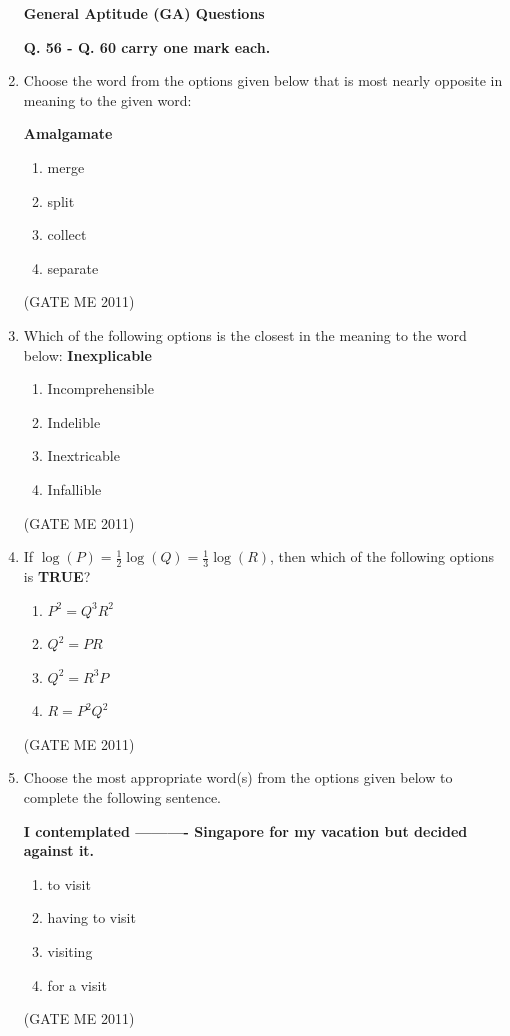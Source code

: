 \documentclass[journal]{IEEEtran}
\begin{document}
\begin{enumerate}
\textbf{General Aptitude (GA) Questions}

\textbf{Q. 56 - Q. 60 carry one mark each.}

  \item Choose the word from the options given below that is most nearly opposite in meaning to the given word:
  
\textbf{Amalgamate}
    \begin{enumerate}
      \item merge
      \item split
      \item collect
      \item separate
    \end{enumerate}
    \hfill (GATE ME 2011)

  \item Which of the following options is the closest in the meaning to the word below: 
\textbf{Inexplicable}
    \begin{enumerate}
      \item Incomprehensible
      \item Indelible
      \item Inextricable
      \item Infallible
    \end{enumerate}
    \hfill (GATE ME 2011)

  \item If $\log(P) = \frac{1}{2} \log(Q) = \frac{1}{3} \log(R)$, then which of the following options is \textbf{TRUE}?
  \begin{multicols}{4}
    \begin{enumerate}
      \item $P^2 = Q^3 R^2$
      \item $Q^2 = PR$
      \item $Q^2 = R^3 P$
      \item $R = P^2 Q^2$
    \end{enumerate}
  \end{multicols}   
  \hfill (GATE ME 2011)

  \item Choose the most appropriate word(s) from the options given below to complete the following sentence.
  
 \textbf{I contemplated ---------- Singapore for my vacation but decided against it.}
 
    \begin{enumerate}
      \item to visit
      \item having to visit
      \item visiting
      \item for a visit
    \end{enumerate}
    \hfill (GATE ME 2011)
    

\end{enumerate}
\end{document}
